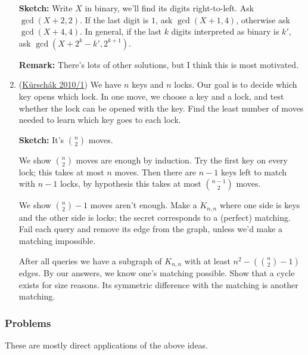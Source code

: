 \documentclass[11pt,paper=letter]{scrartcl}
\begin{document}
\begin{enumerate}
\textbf{Sketch:} Write $X$ in binary, we'll find its digits right-to-left. Ask $\gcd(X + 2, 2)$. If the last digit is $1$, ask $\gcd(X + 1, 4)$, otherwise ask $\gcd(X + 4, 4)$. In general, if the last $k$ digits interpreted as binary is $k'$, ask $\gcd(X + 2^k - k', 2^{k + 1})$.

\textbf{Remark:} There's lots of other solutions, but I think this is most motivated.

\item (\href{https://artofproblemsolving.com/community/c6h596946p3542240}{K\"ursch\'ak 2010/1}) We have $n$ keys and $n$ locks. Our goal is to decide which key opens which lock. In one move, we choose a key and a lock, and test whether the lock can be opened with the key. Find the least number of moves needed to learn which key goes to each lock.

\textbf{Sketch:} It's $\binom{n}{2}$ moves.

We show $\binom{n}{2}$ moves are enough by induction. Try the first key on every lock; this takes at most $n$ moves. Then there are $n-1$ keys left to match with $n-1$ locks, by hypothesis this takes at most $\binom{n-1}{2}$ moves.

We show $\binom{n}{2} - 1$ moves aren't enough. Make a $K_{n, n}$ where one side is keys and the other side is locks; the secret corresponds to a (perfect) matching. Fail each query and remove its edge from the graph, unless we'd make a matching impossible.

After all queries we have a subgraph of $K_{n, n}$ with at least $n^2 - \left( \binom{n}{2} - 1 \right)$ edges. By our answers, we know one's matching possible. Show that a cycle exists for size reasons. Its symmetric difference with the matching is another matching.

\end{enumerate}

\subsubsection*{Problems}

These are mostly direct applications of the above ideas.
\end{document}
